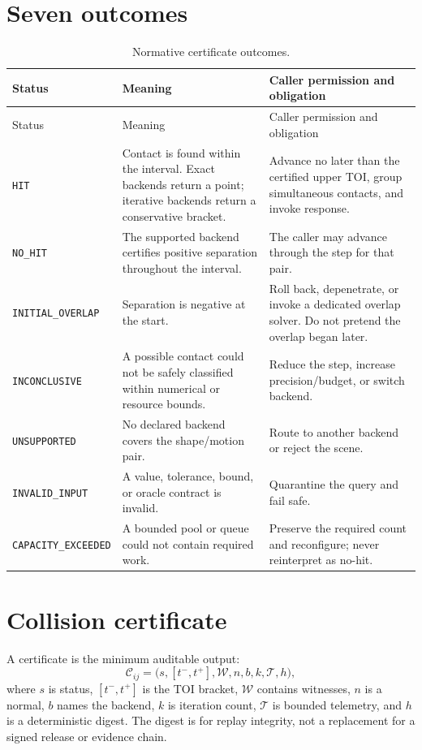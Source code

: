 \documentclass[11pt,a4paper,openany]{book}
\newcommand{\status}[1]{\texttt{#1}}
\begin{document}
\section{Seven outcomes}
\begin{longtable}{@{}L{0.22\textwidth}L{0.30\textwidth}L{0.38\textwidth}@{}}
\caption{Normative certificate outcomes.}\label{tab:statuses}\\
\toprule Status & Meaning & Caller permission and obligation \\ \midrule
\endfirsthead
\toprule Status & Meaning & Caller permission and obligation \\ \midrule
\endhead
\status{HIT} & Contact is found within the interval. Exact backends return a point; iterative backends return a conservative bracket. & Advance no later than the certified upper TOI, group simultaneous contacts, and invoke response. \\
\status{NO\_HIT} & The supported backend certifies positive separation throughout the interval. & The caller may advance through the step for that pair. \\
\status{INITIAL\_OVERLAP} & Separation is negative at the start. & Roll back, depenetrate, or invoke a dedicated overlap solver. Do not pretend the overlap began later. \\
\status{INCONCLUSIVE} & A possible contact could not be safely classified within numerical or resource bounds. & Reduce the step, increase precision/budget, or switch backend. \\
\status{UNSUPPORTED} & No declared backend covers the shape/motion pair. & Route to another backend or reject the scene. \\
\status{INVALID\_INPUT} & A value, tolerance, bound, or oracle contract is invalid. & Quarantine the query and fail safe. \\
\status{CAPACITY\_EXCEEDED} & A bounded pool or queue could not contain required work. & Preserve the required count and reconfigure; never reinterpret as no-hit. \\
\bottomrule
\end{longtable}

\section{Collision certificate}
A certificate is the minimum auditable output:
\begin{equation}
\mathcal{C}_{ij}=\big(s, [t^-,t^+], \mathcal{W}, n, b, k, \mathcal{T}, h\big),
\end{equation}
where $s$ is status, $[t^-,t^+]$ is the TOI bracket, $\mathcal{W}$ contains witnesses, $n$ is a normal, $b$ names the backend, $k$ is iteration count, $\mathcal{T}$ is bounded telemetry, and $h$ is a deterministic digest. The digest is for replay integrity, not a replacement for a signed release or evidence chain.
\end{document}
